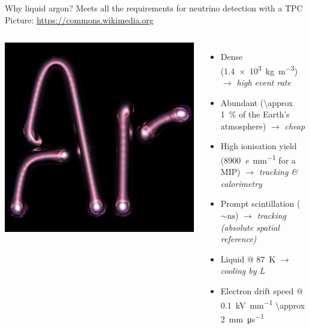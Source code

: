 \documentclass[]{beamer}
\newcommand*{\emphcoltitle}{blue}
\begin{document}
\begin{frame}{Why liquid argon?}{\color{\emphcoltitle} Meets all the requirements for neutrino detection with a TPC}
	{\tiny Picture: \url{https://commons.wikimedia.org}}
	\begin{columns}[c]
		\centering
		\includegraphics[width=\textwidth]{defence/ArTube}\\
		\begin{itemize}
			\item Dense (\SI{1.4e3}{\kilo\gram\per\cubic\metre}) \emph{$\rightarrow$ high event rate}
			\item Abundant (\SI{\approx 1}{\percent} of the Earth's atmosphere) \emph{$\rightarrow$ cheap}
			\item High ionisation yield (\SI{8900}{\elementarycharge\per\milli\metre} for a MIP) \emph{$\rightarrow$ tracking \& calorimetry}
			\item Prompt scintillation ($\sim \si{\nano\second}$) \emph{$\rightarrow$ tracking (absolute spatial reference)}
			\item Liquid @ \SI{87}{\kelvin} \emph{$\rightarrow$ cooling by L}
			\item Electron drift speed @ \SI{0.1}{\kilo\volt\per\milli\meter} \SI{\approx 2}{\milli\meter\per\micro\second}
		\end{itemize}
	\end{columns}
\end{frame}
\end{document}
